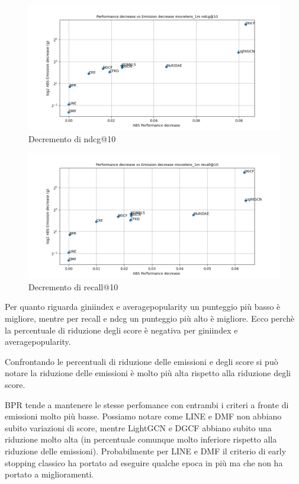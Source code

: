 \begin{figure}[H]
    \centering
     \includegraphics[width=\textwidth]{images/decrement_ndcg@10_movielens_1m.png}
    \caption{Decremento di ndcg@10}
\end{figure}

\begin{figure}[H]
    \centering
     \includegraphics[width=\textwidth]{images/decrement_recall@10_movielens_1m.png}
    \caption{Decremento di recall@10}
\end{figure}


\noindent Per quanto riguarda giniindex e averagepopularity un punteggio più basso è migliore, mentre per recall e ndcg un punteggio più alto è migliore.
Ecco perchè la percentuale di riduzione degli score è negativa per giniindex e averagepopularity.

\noindent Confrontando le percentuali di riduzione delle emissioni e degli score si può notare la riduzione delle emissioni è molto più alta rispetto alla riduzione degli score.

\noindent BPR tende a mantenere le stesse perfomance con entrambi i criteri a fronte di emissioni molto più basse.
Possiamo notare come LINE e DMF non abbiano subito variazioni di score, mentre LightGCN e DGCF abbiano subito una riduzione molto alta (in percentuale comunque molto inferiore rispetto alla riduzione delle emissioni).
Probabilmente per LINE e DMF il criterio di early stopping classico ha portato ad eseguire qualche epoca in più ma che non ha portato a miglioramenti.

